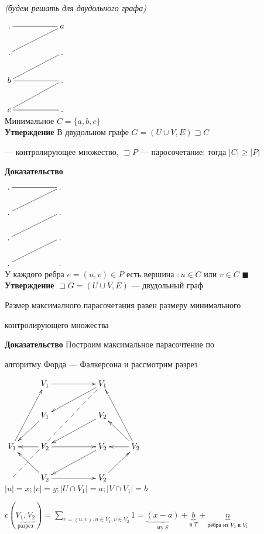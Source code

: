 \documentclass[a4paper, 12pt] {article}
\begin{document}
\textit{(будем решать для двудольного графа)}

$\xymatrix{
	.  \ar@{-}[rr]  & & a \\
	.  \ar@{-}[rru]  & & . \\
	b  \ar@{-}[rr] \ar@{-}[rru]  & &  . \\
	c  \ar@{-}[rr] \ar@{-}[rru]  & &  . \\
}$\\

Минимальное $ C = \{a, b, c\} $\\

\textbf{Утверждение} В двудольном графе $ G = (U \cup V, E) \sqsupset C$ 

--- контролирующее множество, $ \sqsupset P $ --- паросочетание: тогда $ |C| \ge |P| $

\textbf{Доказательство}

$\xymatrix{
	.  \ar@{-}[rr]  & & . \\
	.  \ar@{-}[rru]  & & . \\
	.   \ar@{-}[rru]  & &  . \\
	.   \ar@{-}[rru]  & &  . \\
}$\\

У каждого ребра $ e=(u, v) \in P $ есть вершина $: u \in C $ или $ v \in C $ $ \blacksquare $\\

\textbf{Утверждение} $ \sqsupset G = (U \cup V, E) $ --- двудольный граф

Размер максималного парасочетания равен размеру минимального

 контролирующего множества

\textbf{Доказательство} Построим максимальное парасочтение по

 алгоритму Форда — Фалкерсона и рассмотрим разрез

$\xymatrix{
	& 	V_{1}  \ar@{->}[rr]  & & V_{1} \\
	&	V_{1}  \ar@{<-}[rru]  & & V_{2} \\
	V_{1}  \ar@{<-}[r] \ar@{<-}[rd] \ar@{->}[ruu] \ar@{<-}[ru] & V_{2}  \ar@{->}[rr] \ar@{<-}[rru]  & &  V_{2} & V_{2} \ar@{->}[l] \ar@{<-}[ld] \ar@{->}[luu] \ar@{->}[lu] \\
	\ar@{--}[rrruuu]	& 	V_{2}  \ar@{->}[rr] \ar@{<-}[rru]  & &  V_{2} \\
}$\\

$ |u|=x; |v|=y; |U \cap V_{1}|=a; |V \cap V_{1}|=b $

$ c(\underbrace{V_{1}, V_{2}}_{\text{разрез}})= \sum\limits_{e = (u, v), u \in V_{1}, v \in V_{2}} 1 = \underbrace{(x-a)}_{\text{из } S}+\underbrace{b}_{\text{в } T}+\underbrace{n}_{\text{рёбра из } V_{2} \text{ в } V_{1}}$
\end{document}
